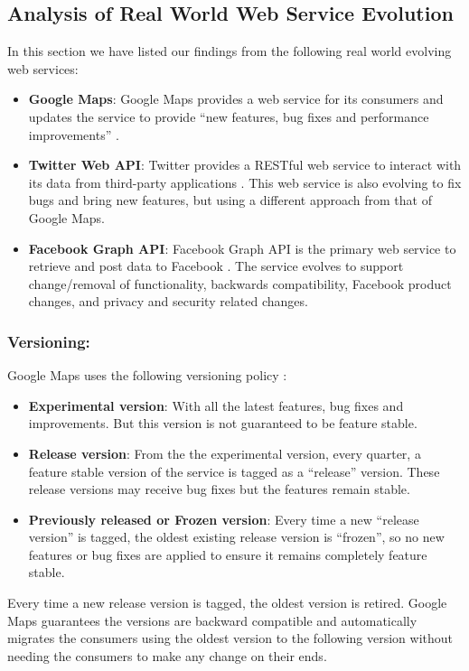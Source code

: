 \documentclass[runningheads,a4paper]{llncs}
\begin{document}

\subsection{Analysis of Real World Web Service Evolution} %
\label{sub:review_of_industry_examples}

In this section we have listed our findings from the following real world evolving web services:

\begin{itemize}
  \item \textbf{Google Maps}: Google Maps provides a web service for its consumers and updates the service to provide ``new features, bug fixes and performance improvements'' \cite{google_maps_versioning}.
  \item \textbf{Twitter Web API}: Twitter provides a RESTful web service to interact with its data from third-party applications \cite{twitter_api}. This web service is also evolving to fix bugs and bring new features, but using a different approach from that of Google Maps.
  \item \textbf{Facebook Graph API}: Facebook Graph API is the primary web service to retrieve and post data to Facebook \cite{facebook_api}. The service evolves to support change/removal of functionality, backwards compatibility, Facebook product changes, and privacy and security related changes.
\end{itemize}

\subsubsection{Versioning:} %
\label{sub:versioning}
Google Maps uses the following versioning policy \cite{google_maps_versioning}:

\begin{itemize}
  \item \textbf{Experimental version}: With all the latest features, bug fixes and improvements. But this version is not guaranteed to be feature stable.
  \item \textbf{Release version}: From the the experimental version, every quarter, a feature stable version of the service is tagged as a ``release'' version. These release versions may receive bug fixes but the features remain stable.
  \item \textbf{Previously released or Frozen version}: Every time a new ``release version'' is tagged, the oldest existing release version is ``frozen'', so no new features or bug fixes are applied to ensure it remains completely feature stable.
\end{itemize}
Every time a new release version is tagged, the oldest version is retired. Google Maps guarantees the versions are backward compatible and automatically migrates the consumers using the oldest version to the following version without needing the consumers to make any change on their ends.
\end{document}
